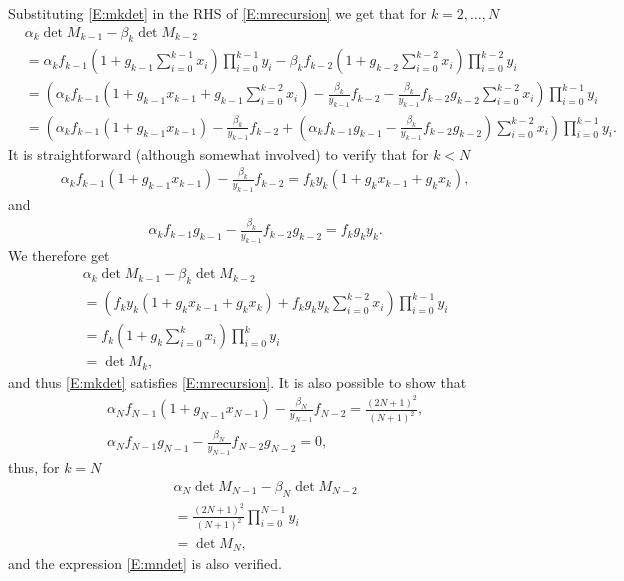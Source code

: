 \documentclass[12pt]{article}
\numberwithin{equation}{section}
\theoremstyle{definition}
\theoremstyle{remark}
\begin{document}
Substituting \eqref{E:mkdet} in the RHS of \eqref{E:mrecursion} we get that for $k=2,\dots,N$
\begin{align*}
     & \alpha_k \det M_{k-1} - \beta_k \det M_{k-2}\\
        &= \alpha_k f_{k-1} \left(1+g_{k-1}\sum_{i=0}^{k-1} x_i\right) \prod_{i=0}^{k-1} y_i - \beta_k f_{k-2}\left(1+g_{k-2}\sum_{i=0}^{k-2} x_i \right) \prod_{i=0}^{k-2} y_i\\
        &= \left( \alpha_k f_{k-1} \left(1+g_{k-1} x_{k-1}+g_{k-1}\sum_{i=0}^{k-2} x_i\right)-\frac{\beta_k}{y_{k-1}} f_{k-2}-\frac{\beta_k}{y_{k-1}} f_{k-2} g_{k-2}\sum_{i=0}^{k-2} x_i \right) \prod_{i=0}^{k-1} y_i\\
        &= \left( \alpha_k f_{k-1}(1+ g_{k-1} x_{k-1}) -\frac{\beta_k}{y_{k-1}} f_{k-2}+\left( \alpha_k f_{k-1} g_{k-1}-\frac{\beta_k}{y_{k-1}} f_{k-2} g_{k-2}\right) \sum_{i=0}^{k-2} x_i\right) \prod_{i=0}^{k-1} y_i.
\end{align*}
It is straightforward (although somewhat involved) to verify that for $k<N$
\begin{align*}
    & \alpha_k f_{k-1} (1+ g_{k-1} x_{k-1}) -\frac{\beta_k}{y_{k-1}} f_{k-2} = f_k y_k (1+g_k x_{k-1}+g_k x_k),
\end{align*}
and
\begin{align*}
    & \alpha_k f_{k-1}g_{k-1}-\frac{\beta_k}{y_{k-1}} f_{k-2} g_{k-2} = f_k g_k y_k.
\end{align*}
We therefore get
\begin{align*}
    & \alpha_k \det M_{k-1} -\beta_k \det M_{k-2} \\
    & = \left( f_k y_k(1+g_k x_{k-1}+g_k x_k)+ f_k g_k y_k \sum_{i=0}^{k-2} x_i\right) \prod_{i=0}^{k-1} y_i\\
    & = f_k \left( 1+g_k \sum_{i=0}^{k} x_i\right) \prod_{i=0}^{k} y_i\\
    & = \det M_k,
\end{align*}
and thus \eqref{E:mkdet} satisfies \eqref{E:mrecursion}. It is also possible to show that
\begin{align*}
    & \alpha_N f_{N-1}(1+ g_{N-1} x_{N-1}) -\frac{\beta_N}{y_{N-1}} f_{N-2} = \frac{(2N+1)^2}{(N+1)^2}, \\
    & \alpha_N f_{N-1} g_{N-1}-\frac{\beta_N}{y_{N-1}} f_{N-2} g_{N-2} = 0,
\end{align*}
thus, for $k=N$
\begin{align*}
    & \alpha_N \det M_{N-1} -\beta_N \det M_{N-2} \\
    & = \frac{(2N+1)^2}{(N+1)^2} \prod_{i=0}^{N-1} y_i  \\
    & = \det M_N,
\end{align*}
and the expression \eqref{E:mndet} is also verified.
\end{document}
